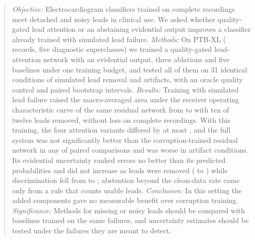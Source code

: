 \begin{abstract}
\emph{Objective:} Electrocardiogram classifiers trained on complete recordings meet detached and noisy leads in
clinical use. We asked whether quality-gated lead attention or an abstaining evidential output
improves a classifier already trained with simulated lead failure.
\emph{Methods:} On PTB-XL (\nRecordsKept{} records, five diagnostic superclasses) we trained a quality-gated
lead-attention network with an evidential output, three ablations and five baselines under one training budget, and
tested all of them on 31 identical conditions of simulated lead removal and artifacts, with an oracle quality control and paired bootstrap intervals. \emph{Results:} Training with simulated
lead failure raised the macro-averaged area under the receiver operating characteristic curve of the same residual
network from \aucResCleanKTen{} to \aucResDropKTen{} with ten of twelve leads removed, without loss on complete
recordings. With this training, the four attention variants differed by at most \ablRangeKTen{}, and the full system
was not significantly better than the corruption-trained residual network in any of \bootNRows{} paired comparisons
and was worse in \bootNSigNeg{} artifact conditions. Its evidential uncertainty ranked errors no better than its
predicted probabilities and did not increase as leads were removed (\meanUKZero{} to \meanUKTen) while
discrimination fell from \aucLgEdlKZero{} to \aucLgEdlKTen; abstention beyond the clean-data rate came only from a
rule that counts usable leads. \emph{Conclusion:} In this setting the added components gave no measurable benefit
over corruption training. \emph{Significance:} Methods for missing or noisy leads should be compared with baselines
trained on the same failures, and uncertainty estimates should be tested under the failures they are meant to
detect.
\end{abstract}
